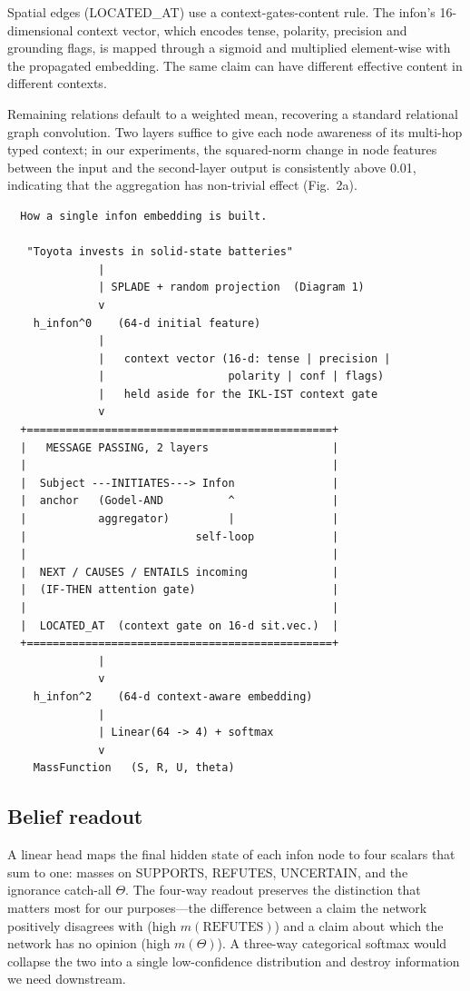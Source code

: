 \documentclass[11pt,a4paper]{article}
\begin{document}
Spatial edges (LOCATED\_AT) use a context-gates-content rule.
The infon's 16-dimensional context vector, which encodes tense,
polarity, precision and grounding flags, is mapped through a
sigmoid and multiplied element-wise with the propagated
embedding. The same claim can have different effective content
in different contexts.

Remaining relations default to a weighted mean, recovering a
standard relational graph convolution. Two layers suffice to
give each node awareness of its multi-hop typed context; in our
experiments, the squared-norm change in node features between
the input and the second-layer output is consistently above
0.01, indicating that the aggregation has non-trivial effect
(Fig.~2a).

\begin{verbatim}
  How a single infon embedding is built.

   "Toyota invests in solid-state batteries"
              |
              | SPLADE + random projection  (Diagram 1)
              v
    h_infon^0    (64-d initial feature)
              |
              |   context vector (16-d: tense | precision |
              |                   polarity | conf | flags)
              |   held aside for the IKL-IST context gate
              v
  +===============================================+
  |   MESSAGE PASSING, 2 layers                   |
  |                                               |
  |  Subject ---INITIATES---> Infon               |
  |  anchor   (Godel-AND          ^               |
  |           aggregator)         |               |
  |                          self-loop            |
  |                                               |
  |  NEXT / CAUSES / ENTAILS incoming             |
  |  (IF-THEN attention gate)                     |
  |                                               |
  |  LOCATED_AT  (context gate on 16-d sit.vec.)  |
  +===============================================+
              |
              v
    h_infon^2    (64-d context-aware embedding)
              |
              | Linear(64 -> 4) + softmax
              v
    MassFunction   (S, R, U, theta)
\end{verbatim}

\subsection{Belief readout}

A linear head maps the final hidden state of each infon node to
four scalars that sum to one: masses on SUPPORTS, REFUTES,
UNCERTAIN, and the ignorance catch-all $\Theta$. The four-way
readout preserves the distinction that matters most for our
purposes---the difference between a claim the network positively
disagrees with (high $m(\text{REFUTES})$) and a claim about
which the network has no opinion (high $m(\Theta)$). A three-way
categorical softmax would collapse the two into a single
low-confidence distribution and destroy information we need
downstream.
\end{document}
